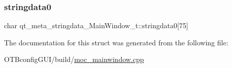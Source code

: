 \subsubsection{\texorpdfstring{stringdata0}{stringdata0}}
{\footnotesize\ttfamily char qt\+\_\+meta\+\_\+stringdata\+\_\+\+Main\+Window\+\_\+t\+::stringdata0\mbox{[}75\mbox{]}}



The documentation for this struct was generated from the following file\+:\begin{DoxyCompactItemize}
\item 
O\+T\+Bconfig\+G\+U\+I/build/\hyperlink{moc__mainwindow_8cpp}{moc\+\_\+mainwindow.\+cpp}\end{DoxyCompactItemize}
